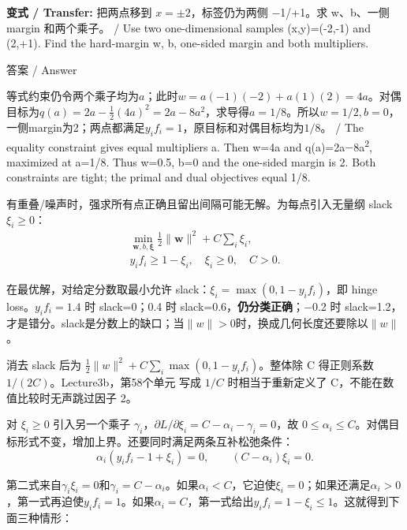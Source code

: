 \textbf{变式 / Transfer:} 把两点移到 \(x=\pm2\)，标签仍为两侧 \ensuremath{-}1/+1。求 w、b、一侧 margin 和两个乘子。 / Use two one-dimensional samples (x,y)=(-2,-1) and (2,+1). Find the hard-margin w, b, one-sided margin and both multipliers.



\begin{StudySolution}{答案 / Answer}


等式约束仍令两个乘子均为\(a\)；此时\(w=a(-1)(-2)+a(1)(2)=4a\)。对偶目标为\(q(a)=2a-\tfrac12(4a)^2=2a-8a^2\)，求导得\(a=1/8\)。所以\(w=1/2,b=0\)，一侧margin为2；两点都满足\(y_if_i=1\)，原目标和对偶目标均为\(1/8\)。 / The equality constraint gives equal multipliers a. Then w=4a and q(a)=2a\ensuremath{-}8a\textsuperscript{2}, maximized at a=1/8. Thus w=0.5, b=0 and the one-sided margin is 2. Both constraints are tight; the primal and dual objectives equal 1/8.


\end{StudySolution}





有重叠/噪声时，强求所有点正确且留出间隔可能无解。为每点引入无量纲 slack \(\xi_i\ge0\)：
\[
\begin{gathered}\min_{\mathbf w,b,\boldsymbol\xi}\frac12\|\mathbf w\|^2+C\sum_i\xi_i,\\
y_if_i\ge1-\xi_i,\quad\xi_i\ge0,\quad C>0.\end{gathered}\tag{3.13}
\]


在最优解，对给定分数取最小允许 slack：\(\xi_i=\max(0,1-y_if_i)\)，即 hinge loss。\(y_if_i=1.4\) 时 slack=0；0.4 时 slack=0.6，\textbf{仍分类正确}；\ensuremath{-}0.2 时 slack=1.2，才是错分。slack是分数上的缺口；当\(\|w\|>0\)时，换成几何长度还要除以\(\|w\|\)。


消去 slack 后为 \(\frac12\|w\|^2+C\sum_i\max(0,1-y_if_i)\)。整体除 C 得正则系数 \(1/(2C)\)。Lecture3b，第58个单元 写成 \(1/C\) 时相当于重新定义了 C，不能在数值比较时无声跳过因子 2。


对 \(\xi_i\ge0\) 引入另一个乘子 \(\gamma_i\)，\(\partial L/\partial\xi_i=C-\alpha_i-\gamma_i=0\)，故 \(0\le\alpha_i\le C\)。对偶目标形式不变，增加上界。还要同时满足两条互补松弛条件：
\[
\alpha_i(y_if_i-1+\xi_i)=0,\qquad (C-\alpha_i)\xi_i=0.
\tag{3.13a}
\]


第二式来自\(\gamma_i\xi_i=0\)和\(\gamma_i=C-\alpha_i\)。如果\(\alpha_i<C\)，它迫使\(\xi_i=0\)；如果还满足\(\alpha_i>0\)，第一式再迫使\(y_if_i=1\)。如果\(\alpha_i=C\)，第一式给出\(y_if_i=1-\xi_i\le1\)。这就得到下面三种情形：


